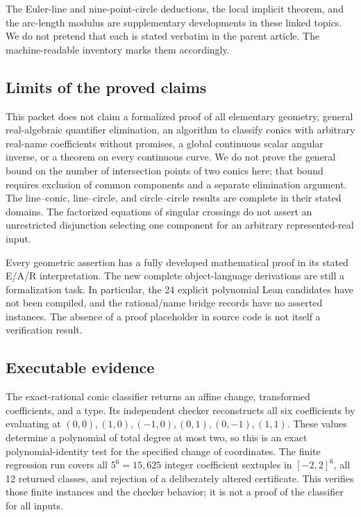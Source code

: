 The Euler-line and nine-point-circle deductions, the local implicit theorem,
and the arc-length modulus are supplementary developments in these linked
topics. We do not pretend that each is stated verbatim in the parent article.
The machine-readable inventory marks them accordingly.

\subsection{Limits of the proved claims}

This packet does not claim a formalized proof of all elementary geometry,
general real-algebraic quantifier elimination, an algorithm to classify conics
with arbitrary real-name coefficients without promises, a global continuous
scalar angular inverse, or a theorem on every continuous curve. We do not prove
the general bound on the number of intersection points of two conics here;
that bound requires exclusion of common components and a separate elimination
argument. The line--conic, line--circle, and circle--circle results are complete
in their stated domains. The factorized equations of singular crossings do not
assert an unrestricted disjunction selecting one component for an arbitrary
represented-real input.

Every geometric assertion has a fully developed mathematical proof in its
stated E/A/R interpretation. The new complete object-language derivations are
still a formalization task. In particular, the 24 explicit polynomial Lean
candidates have not been compiled, and the rational/name bridge records have
no asserted instances. The absence of a proof placeholder in source code is
not itself a verification result.

\subsection{Executable evidence}

The exact-rational conic classifier returns an affine change, transformed
coefficients, and a type. Its independent checker reconstructs all six
coefficients by evaluating at $(0,0),(1,0),(-1,0),(0,1),(0,-1),(1,1)$.
These values determine a polynomial of total degree at most two, so this is
an exact polynomial-identity test for the specified change of coordinates.
The finite regression run covers all $5^6=15{,}625$ integer coefficient
sextuples in $[-2,2]^6$, all 12 returned classes, and rejection of a deliberately
altered certificate. This verifies those finite instances and the checker
behavior; it is not a proof of the classifier for all inputs.

